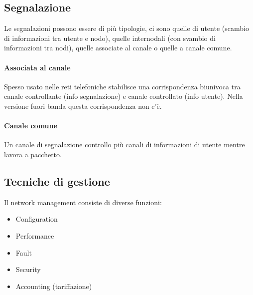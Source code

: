 \documentclass[12pt]{article}
\begin{document}
\subsection{Segnalazione}
Le segnalazioni possono essere di più tipologie, ci sono quelle di utente (scambio di informazioni tra utente e nodo), quelle internodali (con svambio di informazioni tra nodi), quelle associate al canale o quelle a canale comune.

\paragraph{Associata al canale}
Spesso usato nelle reti telefoniche stabilisce una corrispondenza biunivoca tra canale controllante (info segnalazione) e canale controllato (info utente). Nella versione fuori banda questa corrispondenza non c'è.

\paragraph{Canale comune}
Un canale di segnalazione controllo più canali di informazioni di utente mentre lavora a pacchetto.

\subsection{Tecniche di gestione}
Il network management consiste di diverse funzioni:
\begin{itemize}
  \item Configuration
  \item Performance
  \item Fault
  \item Security
  \item Accounting (tariffazione)
\end{itemize}
\end{document}
